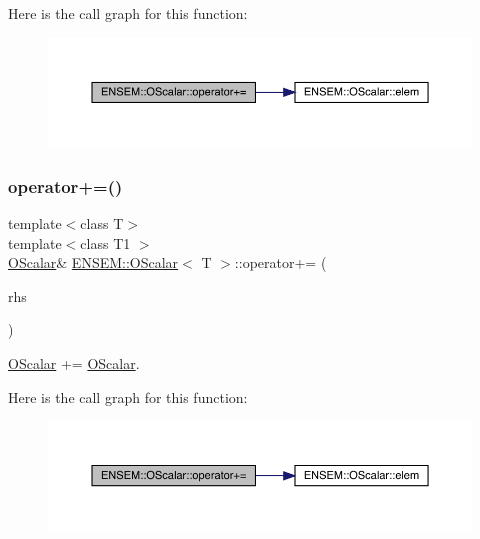 Here is the call graph for this function\+:
\nopagebreak
\begin{figure}[H]
\begin{center}
\leavevmode
\includegraphics[width=350pt]{da/d80/classENSEM_1_1OScalar_a3109a05113cade86410bc77f60812023_cgraph}
\end{center}
\end{figure}
\mbox{\label{classENSEM_1_1OScalar_a3109a05113cade86410bc77f60812023}} 
\subsubsection{\texorpdfstring{operator+=()}{operator+=()}\hspace{0.1cm}{\footnotesize\ttfamily [2/3]}}
{\footnotesize\ttfamily template$<$class T$>$ \\
template$<$class T1 $>$ \\
\mbox{\hyperlink{classENSEM_1_1OScalar}{O\+Scalar}}\& \mbox{\hyperlink{classENSEM_1_1OScalar}{E\+N\+S\+E\+M\+::\+O\+Scalar}}$<$ T $>$\+::operator+= (\begin{DoxyParamCaption}\item[{const \mbox{\hyperlink{classENSEM_1_1OScalar}{O\+Scalar}}$<$ T1 $>$ \&}]{rhs }\end{DoxyParamCaption})\hspace{0.3cm}{\ttfamily [inline]}}



\mbox{\hyperlink{classENSEM_1_1OScalar}{O\+Scalar}} += \mbox{\hyperlink{classENSEM_1_1OScalar}{O\+Scalar}}. 

Here is the call graph for this function\+:
\nopagebreak
\begin{figure}[H]
\begin{center}
\leavevmode
\includegraphics[width=350pt]{da/d80/classENSEM_1_1OScalar_a3109a05113cade86410bc77f60812023_cgraph}
\end{center}
\end{figure}
\mbox{\label{classENSEM_1_1OScalar_a3109a05113cade86410bc77f60812023}} 
